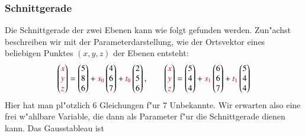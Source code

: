 \subsubsection{Schnittgerade}
Die Schnittgerade der zwei Ebenen kann wie folgt gefunden werden.
Zun"achst beschreiben wir mit der Parameterdarstellung, wie der
Ortsvektor eines beliebigen Punktes $(x,y,z)$ der Ebenen entsteht:
\[
\begin{pmatrix}
\color{red}x\\
\color{red}y\\
\color{red}z\\
\end{pmatrix}
=
\begin{pmatrix}5\\8\\6\end{pmatrix}
+{\color{red}s_0}\begin{pmatrix}4\\6\\7\end{pmatrix}
+{\color{red}t_0}\begin{pmatrix}2\\5\\6\end{pmatrix}
,\qquad
\begin{pmatrix}
\color{red}x\\
\color{red}y\\
\color{red}z\\
\end{pmatrix}
=
\begin{pmatrix}5\\4\\4\end{pmatrix}
+{\color{red}s_1}\begin{pmatrix}6\\6\\7\end{pmatrix}
+{\color{red}t_1}\begin{pmatrix}5\\4\\4\end{pmatrix}
\]
Hier hat man pl"otzlich 6 Gleichungen f"ur 7 Unbekannte. Wir erwarten
also eine frei w"ahlbare Variable, die dann als Parameter f"ur die
Schnittgerade dienen kann. Das Gausstableau ist
